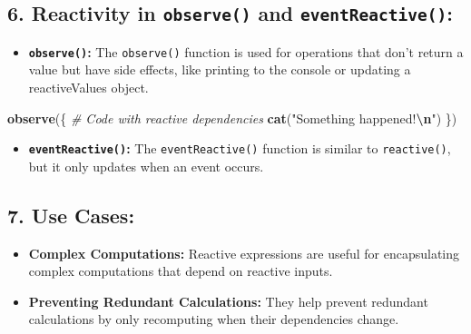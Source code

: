 \documentclass[
]{book}
\newenvironment{Shaded}{\begin{snugshade}}{\end{snugshade}}
\newcommand{\CommentTok}[1]{\textcolor[rgb]{0.56,0.35,0.01}{\textit{#1}}}
\newcommand{\FunctionTok}[1]{\textcolor[rgb]{0.13,0.29,0.53}{\textbf{#1}}}
\newcommand{\NormalTok}[1]{#1}
\newcommand{\OtherTok}[1]{\textcolor[rgb]{0.56,0.35,0.01}{#1}}
\newcommand{\SpecialCharTok}[1]{\textcolor[rgb]{0.81,0.36,0.00}{\textbf{#1}}}
\newcommand{\StringTok}[1]{\textcolor[rgb]{0.31,0.60,0.02}{#1}}
\providecommand{\tightlist}{%
  \setlength{\itemsep}{0pt}\setlength{\parskip}{0pt}}
\begin{document}
\hypertarget{reactivity-in-observe-and-eventreactive}{%
\subsection{\texorpdfstring{6. \textbf{Reactivity in \texttt{observe()} and \texttt{eventReactive()}:}}{6. Reactivity in observe() and eventReactive():}}\label{reactivity-in-observe-and-eventreactive}}

\begin{itemize}
\tightlist
\item
  \textbf{\texttt{observe()}:} The \texttt{observe()} function is used for operations that don't return a value but have side effects, like printing to the console or updating a reactiveValues object.
\end{itemize}

\begin{Shaded}
\begin{Highlighting}[]
\FunctionTok{observe}\NormalTok{(\{}
  \CommentTok{\# Code with reactive dependencies}
  \FunctionTok{cat}\NormalTok{(}\StringTok{"Something happened!}\SpecialCharTok{\textbackslash{}n}\StringTok{"}\NormalTok{)}
\NormalTok{\})}
\end{Highlighting}
\end{Shaded}

\begin{itemize}
\tightlist
\item
  \textbf{\texttt{eventReactive()}:} The \texttt{eventReactive()} function is similar to \texttt{reactive()}, but it only updates when an event occurs.
\end{itemize}

\begin{Shaded}
\end{Shaded}

\hypertarget{use-cases}{%
\subsection{\texorpdfstring{7. \textbf{Use Cases:}}{7. Use Cases:}}\label{use-cases}}

\begin{itemize}
\tightlist
\item
  \textbf{Complex Computations:} Reactive expressions are useful for encapsulating complex computations that depend on reactive inputs.
\item
  \textbf{Preventing Redundant Calculations:} They help prevent redundant calculations by only recomputing when their dependencies change.
\end{itemize}
\end{document}
